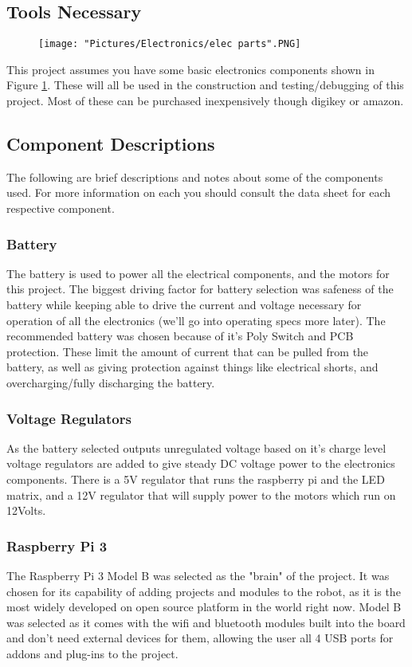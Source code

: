 \documentclass[12pt]{article}
\begin{document}
\subsection{Tools Necessary}

\begin{figure}[H]
  	\centering
   	\texttt{[image: "Pictures/Electronics/elec parts".PNG]}
  	\caption{}
	\label{elec parts}
\end{figure}

This project assumes you have some basic electronics components shown in Figure \ref{elec parts}. These will all be used in the construction and testing/debugging of this project. Most of these can be purchased inexpensively though digikey or amazon. 

\subsection{Component Descriptions}
The following are brief descriptions and notes about some of the components used. For more information on each you should consult the data sheet for each respective component. 
\subsubsection{Battery}
The battery is used to power all the electrical components, and the motors for this project. The biggest driving factor for battery selection was safeness of the battery while keeping able to drive the current and voltage necessary for operation of all the electronics (we'll go into operating specs more later). The recommended battery was chosen because of it's Poly Switch and PCB protection. These limit the amount of current that can be pulled from the battery, as well as giving protection against things like electrical shorts, and overcharging/fully discharging the battery. 
\subsubsection{Voltage Regulators}
As the battery selected outputs unregulated voltage based on it's charge level voltage regulators are added to give steady DC voltage power to the electronics components. There is a 5V regulator that runs the raspberry pi and the LED matrix, and a 12V regulator that will supply power to the motors which run on 12Volts. 
\subsubsection{Raspberry Pi 3}
The Raspberry Pi 3 Model B was selected as the "brain" of the project. It was chosen for its capability of adding projects and modules to the robot, as it is the most widely developed on open source platform in the world right now. Model B was selected as it comes with the wifi and bluetooth modules built into the board and don't need external devices for them, allowing the user all 4 USB ports for addons and plug-ins to the project.  
\end{document}
